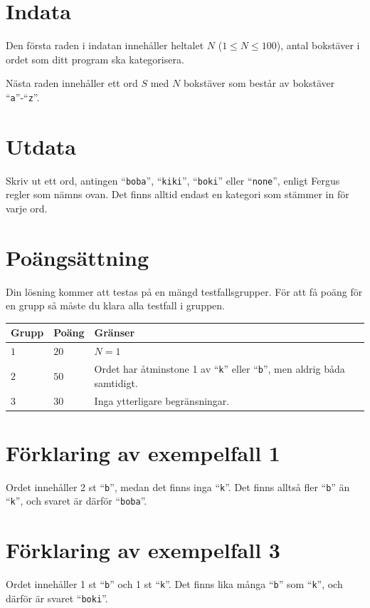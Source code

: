 \section*{Indata}
Den första raden i indatan innehåller heltalet $N$ ($1 \le N \le 100$), antal bokstäver i ordet som ditt program ska kategorisera.

Nästa raden innehåller ett ord $S$ med $N$ bokstäver som består av bokstäver ``\texttt{a}''-``\texttt{z}''.


\section*{Utdata}
Skriv ut ett ord, antingen ``\texttt{boba}'', ``\texttt{kiki}'', ``\texttt{boki}'' eller ``\texttt{none}'', enligt Fergus regler som nämns ovan.
Det finns alltid endast en kategori som stämmer in för varje ord.

\section*{Poängsättning}
Din lösning kommer att testas på en mängd testfallsgrupper.
För att få poäng för en grupp så måste du klara alla testfall i gruppen.

\noindent
\begin{tabular}{| l | l | p{12cm} |}
  \hline
  \textbf{Grupp} & \textbf{Poäng} & \textbf{Gränser} \\ \hline
  $1$    & $20$       & $N = 1$ \\ \hline
  $2$    & $50$       & Ordet har åtminstone 1 av ``\texttt{k}'' eller ``\texttt{b}'', men aldrig båda samtidigt. \\ \hline
  $3$    & $30$       & Inga ytterligare begränsningar. \\ \hline
\end{tabular}

\section*{Förklaring av exempelfall 1}
Ordet innehåller 2 st ``\texttt{b}'', medan det finns inga ``\texttt{k}''. Det finns alltså fler ``\texttt{b}'' än ``\texttt{k}'', och svaret är därför ``\texttt{boba}''.

\section*{Förklaring av exempelfall 3}
Ordet innehåller 1 st ``\texttt{b}'' och 1 st ``\texttt{k}''. Det finns lika många ``\texttt{b}'' som ``\texttt{k}'', och därför är svaret ``\texttt{boki}''.
